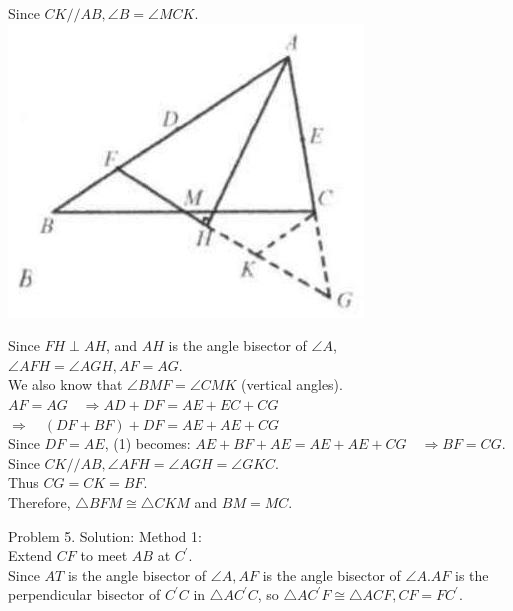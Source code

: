 \documentclass[10pt]{article}
\begin{document}
Since \(C K / / A B, \angle B=\angle M C K\).\\
\includegraphics[max width=\textwidth, center]{2025_04_17_97bc1f7e44d93c271a88g-068}

Since \(F H \perp A H\), and \(A H\) is the angle bisector of \(\angle A\),\\
\(\angle A F H=\angle A G H, A F=A G\).\\
We also know that \(\angle B M F=\angle C M K\) (vertical angles).\\
\(A F=A G \quad \Rightarrow A D+D F=A E+E C+C G\)\\
\(\Rightarrow \quad(D F+B F)+D F=A E+A E+C G\)\\
Since \(D F=A E\), (1) becomes: \(A E+B F+A E=A E+A E+C G \quad \Rightarrow B F=C G\).\\
Since \(C K / / A B, \angle A F H=\angle A G H=\angle G K C\).\\
Thus \(C G=C K=B F\).\\
Therefore, \(\triangle B F M \cong \triangle C K M\) and \(B M=M C\).

Problem 5. Solution:
Method 1:\\
Extend \(C F\) to meet \(A B\) at \(C^{\prime}\).\\
Since \(A T\) is the angle bisector of \(\angle A, A F\) is the angle bisector of \(\angle A . A F\) is the perpendicular bisector of \(C^{\prime} C\) in \(\triangle A C^{\prime} C\), so \(\triangle A C^{\prime} F \cong \triangle A C F, C F=F C^{\prime}\).
\end{document}
